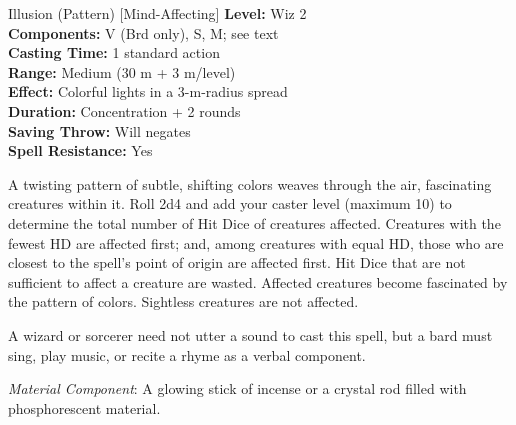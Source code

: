 {Illusion (Pattern) [Mind-Affecting]}
{
	\textbf{Level:}
	Wiz 2\\
	\textbf{Components:}
	V (Brd only), S, M; see text\\
	\textbf{Casting Time:}
	1 standard action\\
	\textbf{Range:}
	Medium (30 m + 3 m/level)\\
	\textbf{Effect:}
	Colorful lights in a 3-m-radius spread\\
	\textbf{Duration:}
	Concentration + 2 rounds\\
	\textbf{Saving Throw:}
	Will negates\\
	\textbf{Spell Resistance:}
	Yes\\
}
{
	A twisting pattern of subtle, shifting colors weaves through the air, fascinating creatures within it. Roll 2d4 and add your caster level (maximum 10) to determine the total number of Hit Dice of creatures affected. Creatures with the fewest HD are affected first; and, among creatures with equal HD, those who are closest to the spell's point of origin are affected first. Hit Dice that are not sufficient to affect a creature are wasted. Affected creatures become fascinated by the pattern of colors. Sightless creatures are not affected.

	A wizard or sorcerer need not utter a sound to cast this spell, but a bard must sing, play music, or recite a rhyme as a verbal component.

	\textit{Material Component}:
	A glowing stick of incense or a crystal rod filled with phosphorescent material.

}
